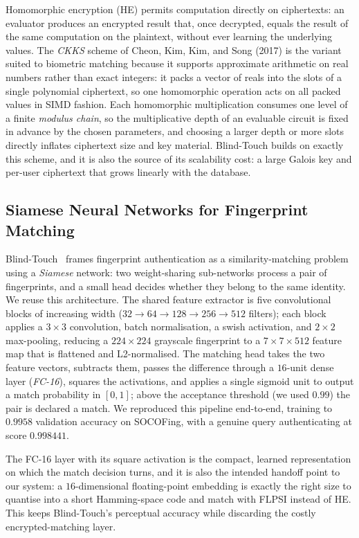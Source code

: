 \documentclass[11pt,a4paper]{article}
\begin{document}
Homomorphic encryption (HE) permits computation directly on ciphertexts: an
evaluator produces an encrypted result that, once decrypted, equals the result of the
same computation on the plaintext, without ever learning the underlying values. The
\emph{CKKS} scheme of Cheon, Kim, Kim, and Song (2017) is the variant suited to
biometric matching because it supports approximate arithmetic on real numbers rather
than exact integers: it packs a vector of reals into the slots of a single polynomial
ciphertext, so one homomorphic operation acts on all packed values in SIMD fashion.
Each homomorphic multiplication consumes one level of a finite \emph{modulus chain},
so the multiplicative depth of an evaluable circuit is fixed in advance by the chosen
parameters, and choosing a larger depth or more slots directly inflates ciphertext
size and key material. Blind-Touch builds on exactly this scheme, and it is also the source of its scalability cost: a
large Galois key and per-user ciphertext that grows linearly with the database.

\subsection{Siamese Neural Networks for Fingerprint Matching}


Blind-Touch~\cite{ChoiWooKim24} frames fingerprint authentication as a
similarity-matching problem using a \emph{Siamese} network: two weight-sharing
sub-networks process a pair of fingerprints, and a small head decides whether they
belong to the same identity. We reuse this architecture. The shared feature extractor
is five convolutional blocks of increasing width ($32\to64\to128\to256\to512$
filters); each block applies a $3\times3$ convolution, batch normalisation, a swish
activation, and $2\times2$ max-pooling, reducing a $224\times224$ grayscale
fingerprint to a $7\times7\times512$ feature map that is flattened and L2-normalised.
The matching head takes the two feature vectors, subtracts them, passes the
difference through a $16$-unit dense layer (\emph{FC-16}), squares the activations,
and applies a single sigmoid unit to output a match probability in $[0,1]$; above the
acceptance threshold (we used $0.99$) the pair is declared a match. We reproduced this
pipeline end-to-end, training to $0.9958$ validation accuracy on SOCOFing, with a
genuine query authenticating at score $0.998441$.

The FC-16 layer with its square activation is the compact, learned representation on
which the match decision turns, and it is also the intended handoff point to our
system: a $16$-dimensional floating-point embedding is exactly the right size to
quantise into a short Hamming-space code and match with FLPSI instead of HE. This
keeps Blind-Touch's perceptual accuracy while discarding the costly encrypted-matching
layer.
\end{document}
